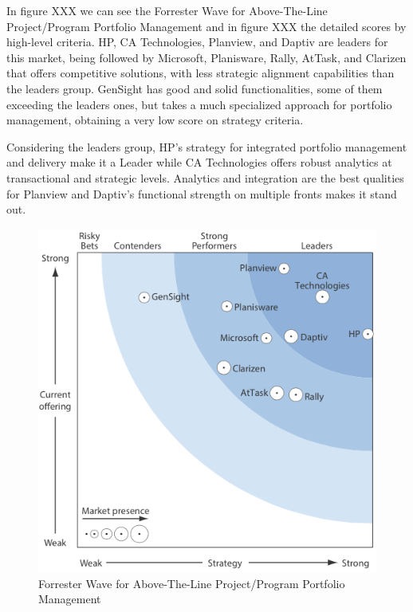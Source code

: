 In figure XXX we can see the Forrester Wave for Above-The-Line Project/Program Portfolio Management and in figure XXX the detailed scores by high-level criteria. HP, CA Technologies, Planview, and Daptiv are leaders for this market, being followed by Microsoft, Planisware, Rally, AtTask, and Clarizen that offers competitive solutions, with less strategic alignment capabilities than the leaders group. GenSight has good and solid functionalities, some of them exceeding the leaders ones, but takes a much specialized approach for portfolio management, obtaining a very low score on strategy criteria.\par
Considering the leaders group, HP’s strategy for integrated portfolio management and delivery make it a Leader while CA Technologies offers robust analytics at transactional and strategic levels. Analytics and integration are the best qualities for Planview and Daptiv's functional strength on multiple fronts makes it stand out.\par



\begin{figure}
\centering
\includegraphics{img/AboveLineWave.png}
\caption{Forrester Wave for Above-The-Line Project/Program Portfolio Management}
\end{figure}

